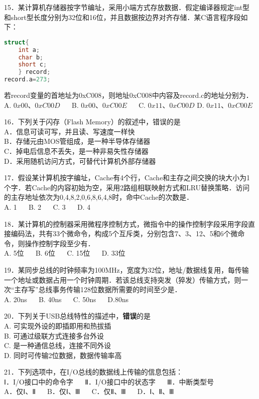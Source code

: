 15．某计算机存储器按字节编址，采用小端方式存放数据．假定编译器规定int型和short型长度分别为32位和16位，并且数据按边界对齐存储．某C语言程序段如下：\\
\begin{lstlisting}[language=cpp]
struct{
    int a;
    char b;
    short c;
    } record;
record.a=273;
\end{lstlisting}
若record变量的首地址为0xC008，则地址0xC008中内容及record.c的地址分别为．\\
A. $0x00$、$0xC00D$ $\quad$ B. $0x00$、$0xC00E$ $\quad$ C. $0x11$、$0xC00D$ D. $0x11$、$0xC00E$

16．下列关于闪存（Flash Memory）的叙述中，错误的是\\
A．信息可读可写，并且读、写速度一样快\\
B．存储元由MOS管组成，是一种半导体存储器\\
C．掉电后信息不丢失，是一种非易失性存储器\\
D．采用随机访问方式，可替代计算机外部存储器

17．假设某计算机按字编址，Cache有4个行，Cache和主存之间交换的块大小为1个字．若Cache的内容初始为空，采用2路组相联映射方式和LRU替换策略．访问的主存地址依次为0,4,8,2,0,6,8,6,4,8时，命中Cache的次数是．\\
A. 1 $\quad$ B. 2 $\quad$ C. 3 $\quad$ D. 4

18．某计算机的控制器采用微程序控制方式，微指令中的操作控制字段采用字段直接编码法，共有33个微命令，构成5个互斥类，分别包含7、3、12、5和6个微命令，则操作控制字段至少有．\\
A. 5位 $\quad$ B. 6位 $\quad$ C. 15位 $\quad$ D. 33位

19．某同步总线的时钟频率为100MHz，宽度为32位，地址/数据线复用，每传输一个地址或数据占用一个时钟周期．若该总线支持突发（猝发）传输方式，则一次“主存写”总线事务传输128位数据所需要的时间至少是．\\
A. 20ns $\quad$ B. 40ns $\quad$ C. 50ns $\quad$ D.80ns

20．下列关于USB总线特性的描述中，\textbf{错误}的是\\
A. 可实现外设的即插即用和热拔插\\
B. 可通过级联方式连接多台外设\\
C. 是一种通信总线，连接不同外设\\
D. 同时可传输2位数据，数据传输率高

21．下列选项中，在I/O总线的数据线上传输的信息包括：\\
Ⅰ．I/O接口中的命令字 $\quad$ Ⅱ．I/O接口中的状态字  $\quad$ Ⅲ．中断类型号\\
A．仅Ⅰ、Ⅱ $\quad$ B．仅Ⅰ、Ⅲ $\quad$ C．仅Ⅱ、Ⅲ $\quad$ D．Ⅰ、Ⅱ、Ⅲ

